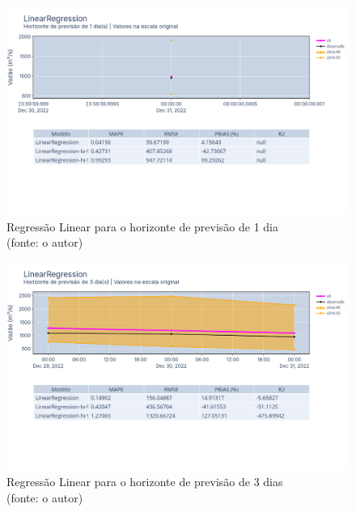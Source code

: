 \begin{figure}[!h]
	\centering
	\includegraphics[scale=0.33]{Figuras/jequiti/resultados/LinearRegression_fh1.png}
	\caption{Regressão Linear para o horizonte de previsão de 1 dia\\(fonte: o autor)}
	\label{fig:jequiti_LinearRegression_fh1}
\end{figure}

\begin{figure}[!h]
	\centering
	\includegraphics[scale=0.33]{Figuras/jequiti/resultados/LinearRegression_fh3.png}
	\caption{Regressão Linear para o horizonte de previsão de 3 dias\\(fonte: o autor)}
	\label{fig:jequiti_LinearRegression_fh3}
\end{figure}

